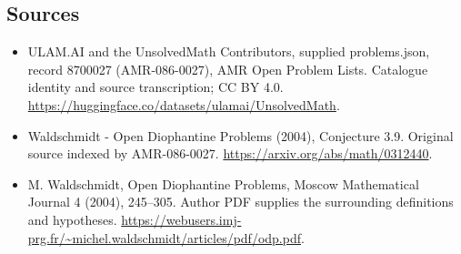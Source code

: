 \documentclass[11pt,a4paper]{article}
\begin{document}
\subsection{Sources}
\begin{itemize}
\item[S1] ULAM.AI and the UnsolvedMath Contributors, supplied problems.json, record 8700027 (AMR-086-0027), AMR Open Problem Lists. Catalogue identity and source transcription; CC BY 4.0.
\url{https://huggingface.co/datasets/ulamai/UnsolvedMath}.
\item[S2] Waldschmidt - Open Diophantine Problems (2004), Conjecture 3.9. Original source indexed by AMR-086-0027.
\url{https://arxiv.org/abs/math/0312440}.
\item[S3] M. Waldschmidt, Open Diophantine Problems, Moscow Mathematical Journal 4 (2004), 245–305. Author PDF supplies the surrounding definitions and hypotheses.
\url{https://webusers.imj-prg.fr/~michel.waldschmidt/articles/pdf/odp.pdf}.
\end{itemize}
\end{document}
